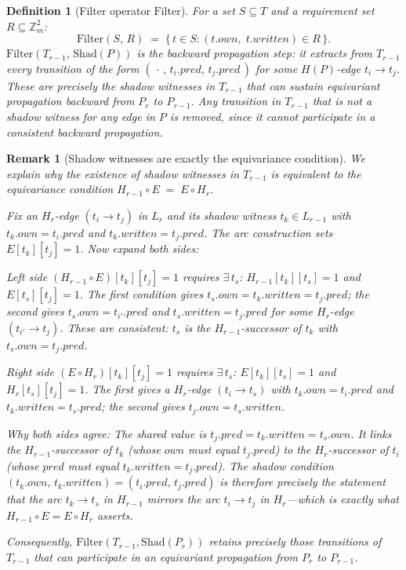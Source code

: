 \documentclass{article}
\newtheorem{definition}{Definition}
\newtheorem{remark}{Remark}
\newcommand{\Shad}{\mathrm{Shad}}
\newcommand{\Filter}{\mathrm{Filter}}
\newcommand{\Zm}{\mathbb{Z}_m}
\newcommand{\own}{\mathit{own}}
\newcommand{\writ}{\mathit{written}}
\newcommand{\pred}{\mathit{pred}}
\begin{document}
\begin{definition}[Filter operator $\Filter$]
\label{def:filter}
For a set $S\subseteq T$ and a requirement set $R\subseteq\Zm^2$:
\[
  \Filter(S,\,R) \;=\; \{\,t\in S : (t.\own,\; t.\writ)\in R\,\}.
\]
$\Filter(T_{r-1},\,\Shad(P))$ is the \emph{backward propagation step}:
it extracts from $T_{r-1}$ every transition of the form
$(\,\cdot\,,\, t_i.\pred,\, t_j.\pred\,)$ for some $H(P)$-edge
$t_i\!\to\!t_j$.  These are precisely the shadow witnesses in $T_{r-1}$
that can sustain equivariant propagation backward from $P_r$ to
$P_{r-1}$.  Any transition in $T_{r-1}$ that is not a shadow witness
for any edge in $P$ is removed, since it cannot participate in a
consistent backward propagation.
\end{definition}

\begin{remark}[Shadow witnesses are exactly the equivariance condition]
\label{rem:equiv}
We explain why the existence of shadow witnesses in $T_{r-1}$ is
equivalent to the equivariance condition
$H_{r-1}\circ E \;=\; E\circ H_r$.

Fix an $H_r$-edge $(t_i\!\to\!t_j)$ in $L_r$ and its shadow witness
$t_k\in L_{r-1}$ with $t_k.\own=t_i.\pred$ and $t_k.\writ=t_j.\pred$.
The arc construction sets $E[t_k][t_j]=1$.  Now expand both sides:

\emph{Left side $(H_{r-1}\circ E)[t_k][t_j]=1$}
requires $\exists\,t_s$: $H_{r-1}[t_k][t_s]=1$ and $E[t_s][t_j]=1$.
The first condition gives $t_s.\own = t_k.\writ = t_j.\pred$; the
second gives $t_s.\own = t_{i'}.\pred$ and $t_s.\writ = t_j.\pred$
for some $H_r$-edge $(t_{i'}\!\to\!t_j)$.  These are consistent: $t_s$
is the $H_{r-1}$-successor of $t_k$ with $t_s.\own = t_j.\pred$.

\emph{Right side $(E\circ H_r)[t_k][t_j]=1$}
requires $\exists\,t_s$: $E[t_k][t_s]=1$ and $H_r[t_s][t_j]=1$.
The first gives a $H_r$-edge $(t_i\!\to\!t_s)$ with $t_k.\own=t_i.\pred$
and $t_k.\writ=t_s.\pred$; the second gives $t_j.\own=t_s.\writ$.

\emph{Why both sides agree:}
The shared value is $t_j.\pred = t_k.\writ = t_s.\own$.  It links the
$H_{r-1}$-successor of $t_k$ (whose $\own$ must equal $t_j.\pred$) to
the $H_r$-successor of $t_i$ (whose $\pred$ must equal $t_k.\writ =
t_j.\pred$).  The shadow condition $(t_k.\own,\,t_k.\writ) =
(t_i.\pred,\,t_j.\pred)$ is therefore precisely the statement that the
arc $t_k\!\to\!t_s$ in $H_{r-1}$ mirrors the arc $t_i\!\to\!t_j$ in
$H_r$---which is exactly what $H_{r-1}\circ E = E\circ H_r$ asserts.

Consequently, $\Filter(T_{r-1},\Shad(P_r))$ retains precisely those
transitions of $T_{r-1}$ that can participate in an equivariant
propagation from $P_r$ to $P_{r-1}$.
\end{remark}
\end{document}
